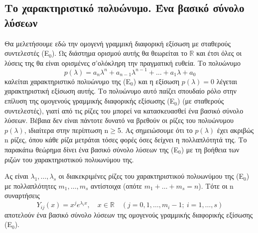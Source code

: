 \documentclass[11pt,a4paper,twoside]{book}
\newcommand{\titlefont}[1]{{\fontfamily{maksf}\selectfont #1}}
\newcounter{thewrhma}[chapter]
\renewcommand{\thethewrhma}{\thechapter.\arabic{thewrhma}}
\newcommand{\thewr}{\refstepcounter{thewrhma}{\bf\titlefont{\textcolor{secondarycolor}{\large Θεώρημα\hspace{2mm}\thethewrhma}}}\hspace{1mm}}{}
\newenvironment{Thewrhma}[1]
{\begin{tcolorbox}[title=\thewr\ \ :\ \  {\textcolor{black}{\bf{\large\titlefont{#1}}}},
breakable,
enhanced standard,
titlerule=-.2pt,
toprule=0pt, 
rightrule=0pt, 
bottomrule=0pt,
colback=white,
left=2mm,
top=1mm,
bottom=0mm,
boxrule=0pt,
colframe=white,
borderline west={1.5mm}{0pt}{secondarycolor},
leftrule=2mm,
sharp corners,
coltitle=secondarycolor]}
{\end{tcolorbox}}
\begin{document}
\subsection{Το χαρακτηριστικό πολυώνυμο. Ένα βασικό σύνολο λύσεων}

Θα μελετήσουμε εδώ την ομογενή γραμμική διαφορική εξίσωση με σταθερούς συντελεστές (Ε$_0$). Ως διάστημα ορισμού αυτής θα θεωρείται το $\mathbb{R}$ και έτσι όλες οι λύσεις της θα είναι ορισμένες σ'ολόκληρη την πραγματική ευθεία.
Το πολυώνυμο
\[
    p(\lambda) = a_n\lambda^n + a_{n-1}\lambda^{n-1} + \dots + a_1\lambda + a_0
\]
καλείται χαρακτηριστικό πολυώνυμο της (Ε$_0$) και η εξίσωση $p(\lambda)=0$ λέγεται χαρακτηριστική εξίσωση αυτής. Το πολυώνυμο αυτό παίζει σπουδαίο ρόλο στην επίλυση της ομογενούς γραμμικής διαφορικής εξίσωσης (Ε$_0$) (με σταθερούς συντελεστές), γιατί από τις ρίζες του μπορεί να κατασκευασθεί ένα βασικό σύνολο λύσεων. Βέβαια δεν είναι πάντοτε δυνατό να βρεθούν οι ρίζες του πολυώνυμου $p(\lambda)$, ιδιαίτερα στην περίπτωση n$\geq$5. Ας σημειώσουμε ότι το $p(\lambda)$ έχει ακριβώς n ρίζες, όπου κάθε ρίζα μετράται τόσες φορές όσες δείχνει η πολλαπλότητά της. Το παρακάτω θεώρημα δίνει ένα βασικό σύνολο λύσεων της (Ε$_0$) με τη βοήθεια των ριζών του χαρακτηριστικού πολυωνύμου της.

\begin{Thewrhma}{19.}
Ας είναι $\lambda_1, \dots, \lambda_s$ οι διακεκριμένες ρίζες του χαρακτηριστικού
πολυωνύμου της (Ε$_0$) με πολλαπλότητες $m_1, \dots, m_s$ αντίστοιχα (οπότε $m_1+\dots+m_s = n$). Τότε οι n συναρτήσεις
\[
    Y_{ij}(x) = x^j e^{\lambda_i x}, \quad x\in\mathbb{R} \quad (j=0,1,\dots,m_i-1; \ i=1,\dots,s)
\]
αποτελούν ένα βασικό σύνολο λύσεων της ομογενούς γραμμικής διαφορικής εξίσωσης (Ε$_0$).
\end{Thewrhma}
\end{document}
